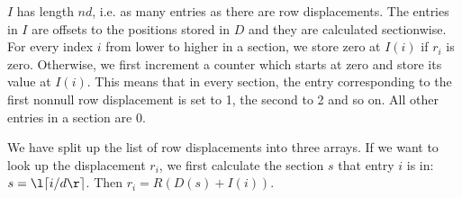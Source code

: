 $I$ has length $nd$, i.e. as many entries as there are row displacements.
The entries in $I$ are offsets to the positions stored in $D$ and they are calculated sectionwise.
For every index $i$ from lower to higher in a section, we store zero at $I(i)$ if $r_i$ is zero.
Otherwise, we first increment a counter which starts at zero and store its value at $I(i)$.
This means that in every section, the entry corresponding to the first nonnull row displacement is set to 1, the second to 2 and so on.
All other entries in a section are 0.

We have split up the list of row displacements into three arrays.
If we want to look up the displacement $r_i$, we first calculate the section $s$ that entry $i$ is in: $s = \l\lceil i / d \r\rceil$.
Then $r_i = R(D(s) + I(i))$.